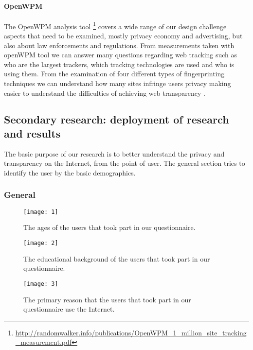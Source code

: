 \paragraph{OpenWPM}

The OpenWPM analysis tool 
\footnote{\url{http://randomwalker.info/publications/OpenWPM\_1\_million\_site\_tracking\_measurement.pdf}} 
covers a wide range of our design challenge aspects that need to be examined, 
mostly privacy economy and advertising, but also about law enforcements and 
regulations. From measurements taken with openWPM tool we can answer many 
questions regarding web tracking such as who are the largest trackers, which 
tracking technologies are used and who is using them. From the examination of 
four different types of fingerprinting techniques we can understand how many 
sites infringe users privacy making easier to understand the difficulties of 
achieving web transparency \cite{trade, wall}.

\subsection{Secondary research: deployment of research and results}

The basic purpose of our research is to better understand  the privacy and 
transparency on the Internet, from the point of  user.
The general section tries to identify the user by the basic demographics.

\subsubsection{General}

\begin{figure}[hp]
\centering
\texttt{[image: 1]}
\caption{The ages of the users that took part in our questionnaire.}
\end{figure}

\begin{figure}[hp]
\centering
\texttt{[image: 2]}
\caption{The educational background of the users that took part in our 
questionnaire.}
\end{figure}

\begin{figure}[hp]
\centering
\texttt{[image: 3]}
\caption{The primary reason that the users that took part in our questionnaire 
use the Internet.}
\end{figure}

